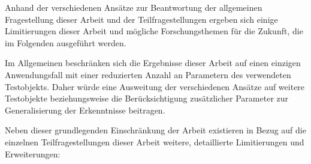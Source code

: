 Anhand der verschiedenen Ansätze zur Beantwortung der allgemeinen Fragestellung dieser Arbeit und der Teilfragestellungen ergeben sich einige Limitierungen dieser Arbeit und mögliche Forschungsthemen für die Zukunft, die im Folgenden ausgeführt werden.

Im Allgemeinen beschränken sich die Ergebnisse dieser Arbeit auf einen einzigen Anwendungsfall mit einer reduzierten Anzahl an Parametern des verwendeten Testobjekts. Daher würde eine Ausweitung der verschiedenen Ansätze auf weitere Testobjekte beziehungsweise die Berücksichtigung zusätzlicher Parameter zur Generalisierung der Erkenntnisse beitragen.

Neben dieser grundlegenden Einschränkung der Arbeit existieren in Bezug auf die einzelnen Teilfragestellungen dieser Arbeit weitere, detaillierte Limitierungen und Erweiterungen:

